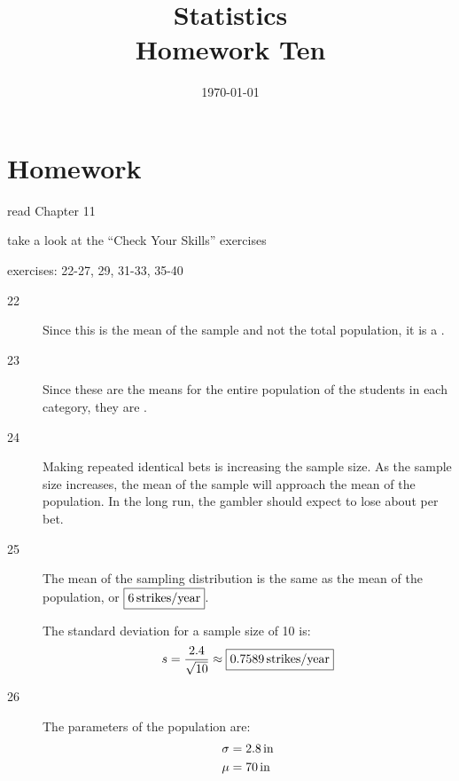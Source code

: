 \documentclass[letterpaper, landscape]{exam}
\title{Statistics \\ Homework Ten}
\date{\today}
\author{}
\newcommand{\cent}{\textcent\xspace}
\begin{document}
  \maketitle

  \section{Homework}
  \ifprintanswers
  \else
    \begin{itemize*}
      \item read Chapter 11 
      \item take a look at the ``Check Your Skills'' exercises
      \item exercises: 22-27, 29, 31-33, 35-40
    \end{itemize*}
  \fi

  \ifprintanswers
    \begin{description}

      \item[22] Since this is the mean of the sample and not the total
        population, it is a .

      \item[23] Since these are the means for the entire population of the
        students in each category, they are .

      \item[24] Making repeated identical bets is increasing the sample size.
        As the sample size increases, the mean of the sample will approach the
        mean of the population. In the long run, the gambler should expect to
        lose about \fbox{ 5.3\cent } per bet.

      \item[25] The mean of the sampling distribution is the same as the mean of
        the population, or $\boxed{ \unit[6]{strikes/year} }$.

        The standard deviation for a sample size of 10 is:
        \[
          s = \frac{2.4}{\sqrt{10}} \approx \boxed{ \unit[0.7589]{strikes/year} }
        \]

      \item[26]
        The parameters of the population are:
        \begin{align*}
          \sigma & = \unit[2.8]{in} \\
          \mu    & = \unit[70]{in} \\
        \end{align*}


\end{description}
\end{document}
